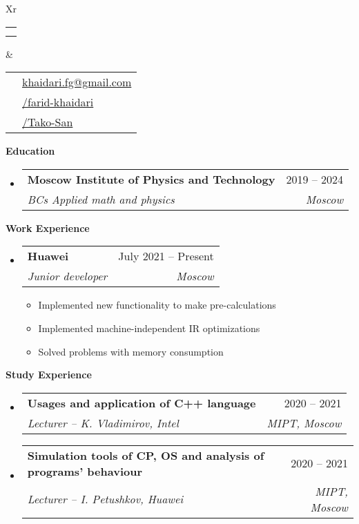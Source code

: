 \documentclass[letterpaper,12pt]{article}[leftmargin=*]
\makeatletter
\def \fullname {Farid Khaidari}
\def \subtitle {}
\def \linkedinicon {\faLinkedin}
\def \linkedinlink {https://www.linkedin.com/in/farid-khaidari/}
\def \linkedintext {/farid-khaidari}
\def \emailicon {\faEnvelope}
\def \emaillink {mailto:khaidari.fg@gmail.com}
\def \emailtext {khaidari.fg@gmail.com}
\def \githubicon {\faGithub}
\def \githublink {https://github.com/Tako-San}
\def \githubtext {/Tako-San}
\def \headertype {\doublecol} %
\def \entryspacing {-0pt}
\def \linkedin {\linkedinicon \hspace{3pt}\href{\linkedinlink}{\linkedintext}}
\def \email {\emailicon \hspace{3pt}\href{\emaillink}{\emailtext}}
\def \github {\githubicon \hspace{3pt}\href{\githublink}{\githubtext}}
\renewcommand{\section}[2]{\vspace{5pt}
  \colorbox{secondary}{\color{white}\raggedbottom\normalsize\textbf{{#1}{\hspace{7pt}#2}}}
}
\newcommand{\resumeEntryStart}{\begin{itemize}[leftmargin=2.5mm]}
\newcommand{\resumeEntryEnd}{\end{itemize}\vspace{\entryspacing}}
\newcommand{\resumeItemListStart}{\begin{itemize}[leftmargin=4.5mm]}
\newcommand{\resumeItemListEnd}{\end{itemize}}
\newcommand{\resumeItem}[1]{
  \item\small{
    {#1 \vspace{-2pt}}
  }
}
\newcommand{\resumeEntryTSDL}[4]{
  \vspace{-1pt}\item[]
    \begin{tabularx}{0.97\textwidth}{X@{\hspace{60pt}}r}
      \textbf{\color{primary}#1} & {\firabook\color{accent}\small#2} \\
      \textit{\color{accent}\small#3} & \textit{\color{accent}\small#4} \\
    \end{tabularx}\vspace{-6pt}
}
\newcommand{\doublecol}[6]{
  \begin{tabularx}{\textwidth}{Xr}
    {
      \begin{tabular}[c]{l}
        \fontsize{35}{45}\selectfont{\color{primary}{{\textbf{\fullname}}}} \\
        {\textit{\subtitle}} %
      \end{tabular}
    } & {
      \begin{tabular}[c]{l@{\hspace{1.5em}}l}
        {\small#4} & {\small#1} \\
        {\small#5} & {\small#2} \\
        {\small#6} & {\small#3}
      \end{tabular}
    }
  \end{tabularx}
}
\newcommand{\singlecol}[6]{
  \begin{tabularx}{\textwidth}{Xr}
    {
      \begin{tabular}[b]{l}
        \fontsize{35}{45}\selectfont{\color{primary}{{\textbf{\fullname}}}} \\
        {\textit{\subtitle}} %
      \end{tabular}
    } & {
      \begin{tabular}[c]{l}
        {\small#1} \\
        {\small#2} \\
        {\small#3} \\
        {\small#4} \\
        {\small#5} \\
        {\small#6}
      \end{tabular}
    }
  \end{tabularx}
}
\makeatother
\begin{document}


\headertype{\email}{\linkedin}{\github}{}{}{}{} %
\vspace{-10pt} %

\section{\faGraduationCap}{Education}

  \resumeEntryStart
    \resumeEntryTSDL
      {Moscow Institute of Physics and Technology}{2019 -- 2024}
      {BCs Applied math and physics}{Moscow}
  \resumeEntryEnd

\section{\faPieChart}{Work Experience}

  \resumeEntryStart
    \resumeEntryTSDL
      {Huawei}{July 2021 -- Present}
      {Junior developer}{Moscow}
    \resumeItemListStart
      \resumeItem {Implemented new functionality to make pre-calculations}
      \resumeItem {Implemented machine-independent IR optimizations}
      \resumeItem {Solved problems with memory consumption}
    \resumeItemListEnd
  \resumeEntryEnd

\section{\faGraduationCap}{Study Experience}

  \resumeEntryStart
    \resumeEntryTSDL
      {Usages and application of C++ language}{2020 -- 2021}
      {Lecturer -- K. Vladimirov, Intel}{MIPT, Moscow}
  \resumeEntryEnd

  \resumeEntryStart
    \resumeEntryTSDL
      {Simulation tools of CP, OS and analysis of programs' behaviour}{2020 -- 2021}
      {Lecturer -- I. Petushkov, Huawei}{MIPT, Moscow}
  \resumeEntryEnd
\end{document}

